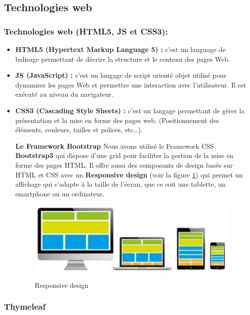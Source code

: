 \subsection{Technologies web } 
\subsubsection{Technologies web (HTML5, JS et CSS3):} 
\begin{itemize}
	
 \item  \textbf{HTML5 (Hypertext Markup Language 5) :} c’est un language de balisage permettant de décrire la structure et le contenu des pages Web. 
 
 \item \textbf{JS (JavaScript) :} c’est un langage de script orienté objet utilisé pour dynamiser les pages Web et permettre une interaction avec l’utilisateur. Il est exécuté au niveau du navigateur. 
 
 \item \textbf{CSS3 (Cascading Style Sheets) :} c’est un langage permettant de gérer la présentation et la mise en forme des pages web. (Positionnement des éléments, couleurs, tailles et polices, etc…). 
 
 

 \subitem  {}  \textbf{Le Framework Bootstrap } 
 Nous avons utilisé le Framework CSS \textbf{Bootstrap3} qui dispose d’une grid pour faciliter la gestion de la mise en forme des pages HTML. Il offre aussi des composants de design basés sur HTML et CSS avec un\textbf{ Responsive design} (voir la figure \ref{fig:responsive}) qui permet un affichage qui s’adapte à la taille de l’écran, que ce soit une tablette, un smartphone ou un ordinateur. 
 
 
\begin{figure}[H]
	\centering
	\includegraphics[width=0.5\linewidth]{images/responsive}
	\caption{Responsive design }
	\label{fig:responsive}
\end{figure}
\end{itemize}

 \subsubsection{Thymeleaf}

